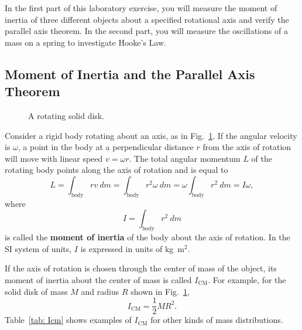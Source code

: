 \documentclass[addpoints]{physlabs}
\begin{document}
\begin{labsection}

\begin{objective}
    In the first part of this laboratory exercise, you will measure the moment of inertia of three different objects about a specified rotational axis and verify the parallel axis theorem. In the second part, you will measure the oscillations of a mass on a spring to investigate Hooke’s Law.
\end{objective}

\begin{theory}
    \subsection*{Moment of Inertia and the Parallel Axis Theorem}

    \begin{figure}
        \centering
        
        \caption{A rotating solid disk. \label{fig: solid disk}}
    \end{figure}
    
    Consider a rigid body rotating about an axis, as in Fig.~\ref{fig: solid disk}. If the angular velocity is $\omega$, a point in the body at a perpendicular distance $r$ from the axis of rotation will move with linear speed $v=\omega r$. The total angular momentum $L$ of the rotating body points along the axis of rotation and is equal to
    \begin{equation}\label{eq:angular momentum}
        L = \int_\text{body} rv~dm = \int_\text{body} r^2\omega~dm = \omega\int_\text{body} r^2~dm = I\omega,
    \end{equation}
    where
    \begin{equation}\label{eq:moment of inertia}
        I = \int_\text{body} r^2~dm
    \end{equation}
    is called the {\bf moment of inertia} of the body about the axis of rotation. In the SI system of units, $I$ is expressed in units of kg~m$^2$.

    If the axis of rotation is chosen through the center of mass of the object, its moment of inertia about the center of mass is called $I_\text{CM}$. For example, for the solid disk of mass $M$ and radius $R$ shown in Fig.~\ref{fig: solid disk},
    \[
        I_\text{CM} = \frac{1}{2}MR^2.
    \]
    Table~\ref{tab: Icm} shows examples of $I_\text{CM}$ for other kinds of mass distributions.    


\end{theory}
\end{labsection}
\end{document}
